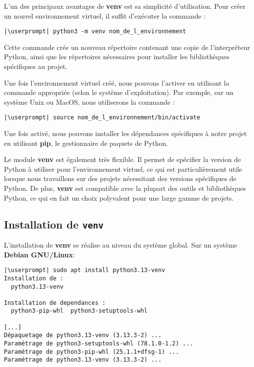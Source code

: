 L'un des principaux avantages de \textbf{venv} est sa simplicité d'utilisation. Pour créer un nouvel environnement virtuel, il suffit d'exécuter la commande :
\begin{lstlisting}[style=bash]
|\userprompt| python3 -m venv nom_de_l_environnement
\end{lstlisting}

Cette commande crée un nouveau répertoire contenant une copie de l'interpréteur Python, ainsi que les répertoires nécessaires pour installer les bibliothèques spécifiques au projet.

Une fois l'environnement virtuel créé, nous pouvons l'activer en utilisant la commande appropriée (selon le système d'exploitation). Par exemple, sur un système Unix ou MacOS, nous utiliserons la commande :
\begin{lstlisting}[style=bash]
|\userprompt| source nom_de_l_environnement/bin/activate
\end{lstlisting}

Une fois activé, nous pouvons installer les dépendances spécifiques à notre projet en utilisant \textbf{pip}, le gestionnaire de paquets de Python.

Le module \textbf{venv} est également très flexible. Il permet de spécifier la version de Python à utiliser pour l'environnement virtuel, ce qui est particulièrement utile lorsque nous travaillons sur des projets nécessitant des versions spécifiques de Python. De plus, \textbf{venv} est compatible avec la plupart des outils et bibliothèques Python, ce qui en fait un choix polyvalent pour une large gamme de projets.

\subsection*{Installation de \texttt{venv}}
L'installation de \textbf{venv} se réalise au niveau du système global. Sur un système \textbf{Debian GNU/Linux}:

\begin{lstlisting}[style=bash]
|\userprompt| sudo apt install python3.13-venv
Installation de :
  python3.13-venv

Installation de dependances :
  python3-pip-whl  python3-setuptools-whl

[...]
Dépaquetage de python3.13-venv (3.13.3-2) ...
Paramétrage de python3-setuptools-whl (78.1.0-1.2) ...
Paramétrage de python3-pip-whl (25.1.1+dfsg-1) ...
Paramétrage de python3.13-venv (3.13.3-2) ...
\end{lstlisting}

